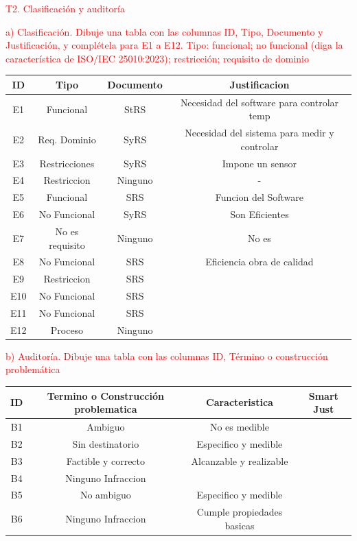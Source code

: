 \documentclass[11pt,a4paper]{article}
\newcommand{\enun}[1]{\textcolor{red}{#1}}
\begin{document}
\enun{T2. Clasificación y auditoría}

\enun{a) Clasificación. Dibuje una tabla con las columnas ID, Tipo, Documento y
Justificación, y complétela para E1 a E12. Tipo: funcional; no funcional (diga la
característica de ISO/IEC 25010:2023); restricción; requisito de dominio}

\begin{center}
\begin{tabularx}{\linewidth}{|c|C|C|C|}
\hline
ID  & Tipo            & Documento & Justificacion \\ \hline
E1  & Funcional       & StRS      & Necesidad del software para controlar temp \\ \hline
E2  & Req. Dominio    & SyRS      & Necesidad del sistema para medir y controlar \\ \hline
E3  & Restricciones   & SyRS      & Impone un sensor \\ \hline
E4  & Restriccion     & Ninguno   & - \\ \hline
E5  & Funcional       & SRS       & Funcion del Software \\ \hline
E6  & No Funcional    & SyRS      & Son Eficientes \\ \hline
E7  & No es requisito & Ninguno   & No es \\ \hline
E8  & No Funcional    & SRS       & Eficiencia obra de calidad \\ \hline
E9  & Restriccion     & SRS       & \\ \hline
E10 & No Funcional    & SRS       & \\ \hline
E11 & No Funcional    & SRS       & \\ \hline
E12 & Proceso         & Ninguno   & \\ \hline
\end{tabularx}
\end{center}


\enun{b) Auditoría. Dibuje una tabla con las columnas ID, Término o construcción
problemática}

\begin{center}
\begin{tabularx}{\linewidth}{|c|C|C|C|}
\hline
ID & Termino o Construcción problematica & Caracteristica & Smart Just \\ \hline
B1 & Ambiguo             & No es medible              & \\ \hline
B2 & Sin destinatorio    & Especifico y medible       & \\ \hline
B3 & Factible y correcto & Alcanzable y realizable    & \\ \hline
B4 & Ninguno Infraccion  &                            & \\ \hline
B5 & No ambiguo          & Especifico y medible       & \\ \hline
B6 & Ninguno Infraccion  & Cumple propiedades basicas & \\ \hline
\end{tabularx}
\end{center}
\end{document}
